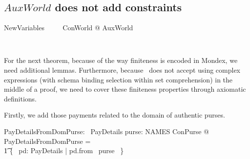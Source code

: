 \subsection{$AuxWorld$ does not add constraints}

\begin{LSDef}
\begin{zed}
   NewVariables ~~~~ \exists ConWorld @ AuxWorld
\end{zed}~\end{LSDef}

For the next theorem, because of the way finiteness is encoded in Mondex,
we need additional lemmas. Furthermore, because \zeves\ does not accept
using complex expressions (with schema binding selection within set comprehension)
in the middle of a proof, we need to cover these finiteness properties through
axiomatic definitions.

Firstly, we add those payments related to the domain of authentic purses.
%
\begin{LNewADef}
\begin{axdef}
   PayDetailsFromDomPurse: \power~PayDetails
\where
    \forall purse: NAMES \finj ConPurse @ PayDetailsFromDomPurse = \\
    \t1 \{~ pd: PayDetails | pd.from \in \dom~purse ~\}
\end{axdef}~\end{LNewADef}

